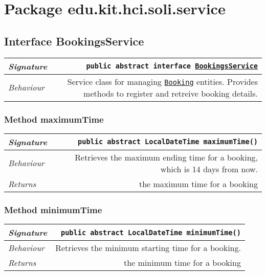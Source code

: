 

\section{Package edu.kit.hci.soli.service}
\begin{adjustwidth}{1.5em}{0pt}
  \subsection{Interface BookingsService\label{edu.kit.hci.soli.service.BookingsService} }
  \begin{adjustwidth}{1.5em}{0pt}
    {\begin{tabularx}{1.0\linewidth}{@{}l R@{}}
      \emph{Signature} & \texttt{public abstract  interface \texttt{\hyperref[edu.kit.hci.soli.service.BookingsService]{\texttt{BookingsService}}}} \\
      \hline
      \emph{Behaviour} & Service class for managing  \texttt{\hyperref[edu.kit.hci.soli.domain.Booking]{\texttt{Booking}}} entities. Provides methods to register and retreive booking details.  \\
      \hline
  
    \end{tabularx}}\subsubsection{Method maximumTime\label{edu.kit.hci.soli.service.BookingsService@maximumTime()}}
    \begin{adjustwidth}{1.5em}{0pt}
      {\begin{tabularx}{1.0\linewidth}{@{}l R@{}}
        \emph{Signature} & \texttt{public abstract \texttt{LocalDateTime} maximumTime()} \\
        \hline
        \emph{Behaviour} & Retrieves the maximum ending time for a booking, which is 14 days from now.    \\
        \hline
        \emph{Returns} & the maximum time for a booking  \\
        \hline
  
      \end{tabularx}}
    \end{adjustwidth}\subsubsection{Method minimumTime\label{edu.kit.hci.soli.service.BookingsService@minimumTime()}}
    \begin{adjustwidth}{1.5em}{0pt}
      {\begin{tabularx}{1.0\linewidth}{@{}l R@{}}
        \emph{Signature} & \texttt{public abstract \texttt{LocalDateTime} minimumTime()} \\
        \hline
        \emph{Behaviour} & Retrieves the minimum starting time for a booking.    \\
        \hline
        \emph{Returns} & the minimum time for a booking  \\
        \hline
  

\end{tabularx}}
\end{adjustwidth}
\end{adjustwidth}
\end{adjustwidth}
